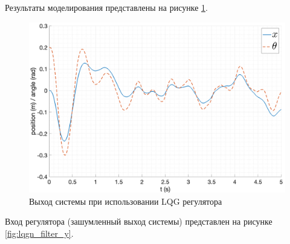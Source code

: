 Результаты моделирования представлены на рисунке \ref{fig:lqgn_filter}. 
\begin{figure}[ht!]
    \centering
    \includegraphics[width=\textwidth]{media/plots/LQGn/out_1.png}
    \caption{Выход системы при использовании LQG регулятора}
    \label{fig:lqgn_filter}
\end{figure}
Вход регулятора (зашумленный выход системы) представлен на рисунке \ref{fig:lqgn_filter_y}. 
